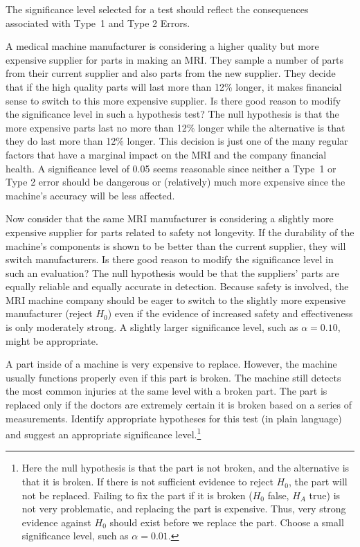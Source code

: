 \begin{tipBox}{
The significance level selected for a test should reflect the consequences associated with Type~1 and Type 2 Errors.}
\end{tipBox}

\begin{example}{A medical machine manufacturer is considering a higher quality but more expensive supplier for parts in making an MRI. They sample a number of parts from their current supplier and also parts from the new supplier. They decide that if the high quality parts will last more than 12\% longer, it makes financial sense to switch to this more expensive supplier. Is there good reason to modify the significance level in such a hypothesis test?}
The null hypothesis is that the more expensive parts last no more than 12\% longer while the alternative is that they do last more than 12\% longer. This decision is just one of the many regular factors that have a marginal impact on the MRI and the company financial health. A significance level of 0.05 seems reasonable since neither a Type~1 or Type 2 error should be dangerous or (relatively) much more expensive since the machine's accuracy will be less affected.
\end{example}

\begin{example}{Now consider that the same MRI manufacturer is considering a slightly more expensive supplier for parts related to safety not longevity. If the durability of the machine's components is shown to be better than the current supplier, they will switch manufacturers. Is there good reason to modify the significance level in such an evaluation?}
The null hypothesis would be that the suppliers' parts are equally reliable and equally accurate in detection. Because safety is involved, the MRI machine company should be eager to switch to the slightly more expensive manufacturer (reject $H_0$) even if the evidence of increased safety and effectiveness is only moderately strong. A slightly larger significance level, such as $\alpha=0.10$, might be appropriate.
\end{example}

\begin{exercise}
A part inside of a machine is very expensive to replace. However, the machine usually functions properly even if this part is broken. The machine still detects the most common injuries at the same level with a broken part. The part is replaced only if the doctors are extremely certain it is broken based on a series of measurements. Identify appropriate hypotheses for this test (in plain language) and suggest an appropriate significance level.\footnote{Here the null hypothesis is that the part is not broken, and the alternative is that it is broken. If there is not sufficient evidence to reject $H_0$, the part will not be replaced. Failing to fix the part if it is broken ($H_0$ false, $H_A$ true) is not very problematic, and replacing the part is expensive. Thus, very strong evidence against $H_0$ should exist before we replace the part. Choose a small significance level, such as $\alpha=0.01$.}
\end{exercise}

